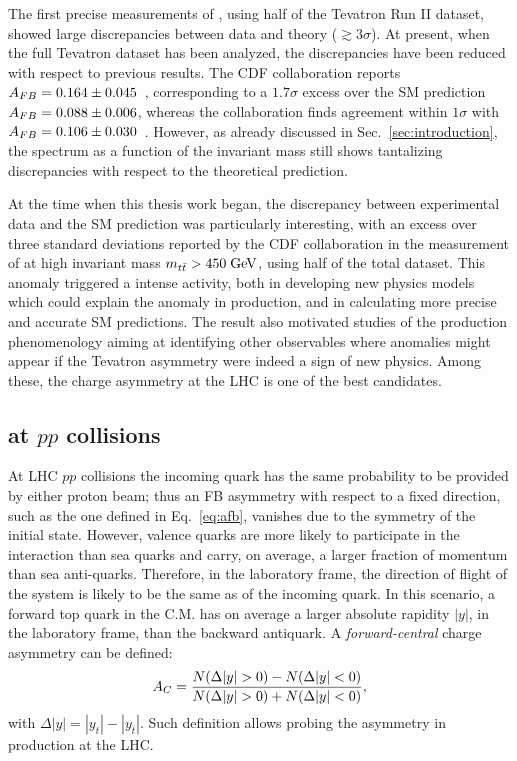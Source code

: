 The first precise measurements of \afb, using half
of the Tevatron Run II dataset, showed large discrepancies between
data and theory ($\gtrsim 3\sigma$).
At present, when the full Tevatron dataset has been analyzed, the
discrepancies have been reduced with respect to previous results. The
CDF collaboration reports \mbox{$A_{FB}=0.164\pm0.045$}~\cite{Aaltonen:2012it},
corresponding to a $1.7\sigma$ excess over the SM prediction \mbox{$A_{FB}{} =
0.088\pm{}0.006$}, whereas the \dzero{} collaboration
finds agreement within $1\sigma$ with
\mbox{$A_{FB}{}=0.106\pm0.030$}~\cite{Abazov:2014cca}. However, as
already discussed in Sec.~\ref{sec:introduction}, the \afb{} spectrum as a
function of the \ttbar{} invariant mass \mtt{} still shows tantalizing
discrepancies with respect to the theoretical prediction.

At the time when this thesis work began, the discrepancy between
experimental data and the SM prediction was particularly interesting,
with an excess over three standard deviations reported by the CDF
collaboration in the measurement of \afb{} at high \ttbar{} invariant
mass $m_{t\bar{t}}{}>450\; \mathrm{GeV}{}$, using half of the total dataset. This anomaly
triggered a intense activity, both in developing new physics models
which could explain the anomaly in \ttbar{} production, and in
calculating more precise and accurate SM predictions. The result also
motivated studies of the \ttbar{} production phenomenology aiming at
identifying other observables where anomalies might appear if the
Tevatron asymmetry were indeed a sign of new physics. Among these, the
charge asymmetry at the LHC is one of the best candidates. 

\subsection{\ac{} at $pp$ collisions}

At LHC $pp$ collisions the incoming quark has the same probability to be provided by
either proton beam; thus an FB asymmetry with respect to a fixed direction,
such as the one defined in Eq.~\ref{eq:afb}, vanishes due to the
symmetry of the initial state. However, valence quarks are more likely to participate
in the interaction than sea quarks and carry, on average, a larger fraction of
momentum than sea anti-quarks. Therefore, in the laboratory frame, the
direction of flight of the \ttbar{} system is likely to be the same as of
the incoming quark. In this scenario, a forward top quark in
the \ttbar{} C.M. has on average a larger absolute rapidity $|y|$, in
the laboratory frame, than the backward antiquark. 
A {\it forward-central} charge asymmetry \ac{} can be defined:
\begin{equation}
\label{eq:ac}
\ac{}=\frac{N(\Delta{}|y|>0)-N(\Delta{}|y|<0)}{N(\Delta{}|y|>0)+N(\Delta{}|y|<0)},
\end{equation}
with $\Delta{}|y|=|y_t| - |y_{\bar{t}}|$.
Such definition allows probing the asymmetry in \ttbar{} production at the LHC.


